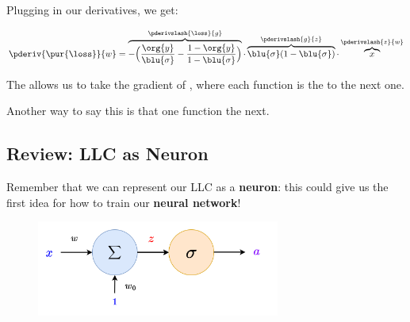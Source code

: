         Plugging in our derivatives, we get:
        
        \begin{equation}
            \pderiv {\pur{\loss}} {w}
            =
            \overbrace{
                -
                \Big(
                    \frac{ \org{y} } { \blu{\sigma} } 
                    -
                    \frac{ 1-\org{y} } { 1 - \blu{\sigma} }
                \Big)
            }^{ \pderivslash{\loss}{g} }
            \cdot
            \overbrace{
                \blu{\sigma} (1-\blu{\sigma})
            }^{ \pderivslash{g}{z} }
            \cdot 
            \overbrace{
            x
            }^{ \pderivslash{z}{w} }
        \end{equation}

        \begin{concept}
            The  allows us to take the gradient of , where each function is the  to the next one.
            
            Another way to say this is that one function  the next.
        \end{concept}
            
    
    \secdiv
    
    \subsection{Review: LLC as Neuron}
    
        Remember that we can represent our LLC as a \textbf{neuron}: this could give us the first idea for how to train our \textbf{neural network}!
        
        \begin{figure}[H]
            \centering
            \includegraphics[width=80mm,scale=0.4]{images/nn_1_5_images/llc_as_neuron.png}
        \end{figure}
        
